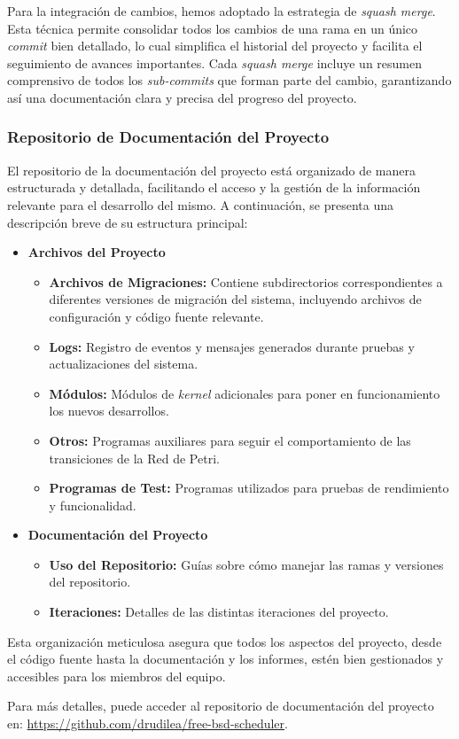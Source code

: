 Para la integración de cambios, hemos adoptado la estrategia de \textit{squash merge}. Esta técnica permite consolidar todos los cambios de una rama en un único \textit{commit} bien detallado, lo cual simplifica el historial del proyecto y facilita el seguimiento de avances importantes. Cada \textit{squash merge} incluye un resumen comprensivo de todos los \textit{sub-commits} que forman parte del cambio, garantizando así una documentación clara y precisa del progreso del proyecto.

\subsubsection{Repositorio de Documentación del Proyecto} \label{sect:wiki}

El repositorio de la documentación del proyecto está organizado de manera estructurada y detallada, facilitando el acceso y la gestión de la información relevante para el desarrollo del mismo. A continuación, se presenta una descripción breve de su estructura principal:

\begin{itemize}
    \item \textbf{Archivos del Proyecto}
    \begin{itemize}
        \item \textbf{Archivos de Migraciones:} Contiene subdirectorios correspondientes a diferentes versiones de migración del sistema, incluyendo archivos de configuración y código fuente relevante.
        \item \textbf{Logs:} Registro de eventos y mensajes generados durante pruebas y actualizaciones del sistema.
        \item \textbf{Módulos:} Módulos de \textit{kernel} adicionales para poner en funcionamiento los nuevos desarrollos.
        \item \textbf{Otros:} Programas auxiliares para seguir el comportamiento de las transiciones de la Red de Petri.
        \item \textbf{Programas de Test:} Programas utilizados para pruebas de rendimiento y funcionalidad.
    \end{itemize}
    \item \textbf{Documentación del Proyecto}
    \begin{itemize}
        \item \textbf{Uso del Repositorio:} Guías sobre cómo manejar las ramas y versiones del repositorio.
        \item \textbf{Iteraciones:} Detalles de las distintas iteraciones del proyecto.
    \end{itemize}
\end{itemize}

Esta organización meticulosa asegura que todos los aspectos del proyecto, desde el código fuente hasta la documentación y los informes, estén bien gestionados y accesibles para los miembros del equipo.

Para más detalles, puede acceder al repositorio de documentación del proyecto en: \url{https://github.com/drudilea/free-bsd-scheduler}.
